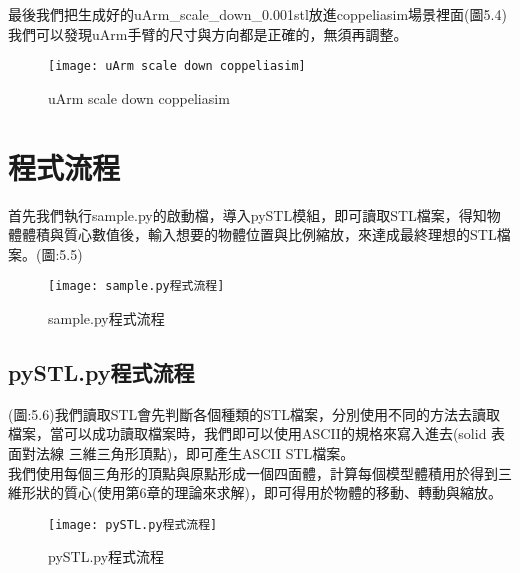 最後我們把生成好的uArm\_scale\_down\_0.001stl放進coppeliasim場景裡面(圖5.4)我們可以發現uArm手臂的尺寸與方向都是正確的，無須再調整。\\

\begin{figure}[hbt!]
\begin{center}
\texttt{[image: uArm scale down coppeliasim]}
\caption{\Large uArm scale down coppeliasim}\label{uArm scale down coppeliasim}
\end{center}
\end{figure}

\section{程式流程}

首先我們執行sample.py的啟動檔，導入pySTL模組，即可讀取STL檔案，得知物體體積與質心數值後，輸入想要的物體位置與比例縮放，來達成最終理想的STL檔案。(圖:5.5)\\

\begin{figure}[hbt!]
\begin{center}
\texttt{[image: sample.py程式流程]}
\caption{\Large sample.py程式流程}\label{sample.py程式流程}
\end{center}
\end{figure}

\subsection{pySTL.py程式流程} 
(圖:5.6)我們讀取STL會先判斷各個種類的STL檔案，分別使用不同的方法去讀取檔案，當可以成功讀取檔案時，我們即可以使用ASCII的規格來寫入進去(solid	表面對法線	三維三角形頂點)，即可產生ASCII STL檔案。\\

    我們使用每個三角形的頂點與原點形成一個四面體，計算每個模型體積用於得到三維形狀的質心(使用第6章的理論來求解)，即可得用於物體的移動、轉動與縮放。\\

\begin{figure}[hbt!]
\begin{center}
\texttt{[image: pySTL.py程式流程]}
\caption{\Large pySTL.py程式流程}\label{pySTL.py程式流程}
\end{center}
\end{figure}



